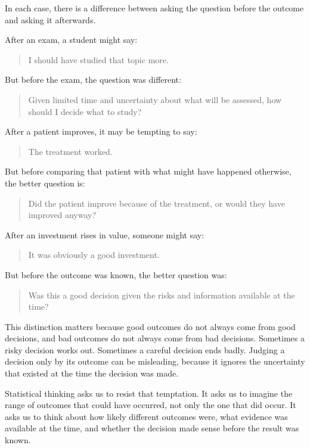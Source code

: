 \documentclass[
  letterpaper,
  DIV=11,
  numbers=noendperiod]{scrreprt}
\begin{document}
In each case, there is a difference between asking the question before
the outcome and asking it afterwards.

After an exam, a student might say:

\begin{quote}
I should have studied that topic more.
\end{quote}

But before the exam, the question was different:

\begin{quote}
Given limited time and uncertainty about what will be assessed, how
should I decide what to study?
\end{quote}

After a patient improves, it may be tempting to say:

\begin{quote}
The treatment worked.
\end{quote}

But before comparing that patient with what might have happened
otherwise, the better question is:

\begin{quote}
Did the patient improve because of the treatment, or would they have
improved anyway?
\end{quote}

After an investment rises in value, someone might say:

\begin{quote}
It was obviously a good investment.
\end{quote}

But before the outcome was known, the better question was:

\begin{quote}
Was this a good decision given the risks and information available at
the time?
\end{quote}

This distinction matters because good outcomes do not always come from
good decisions, and bad outcomes do not always come from bad decisions.
Sometimes a risky decision works out. Sometimes a careful decision ends
badly. Judging a decision only by its outcome can be misleading, because
it ignores the uncertainty that existed at the time the decision was
made.

Statistical thinking asks us to resist that temptation. It asks us to
imagine the range of outcomes that could have occurred, not only the one
that did occur. It asks us to think about how likely different outcomes
were, what evidence was available at the time, and whether the decision
made sense before the result was known.
\end{document}
